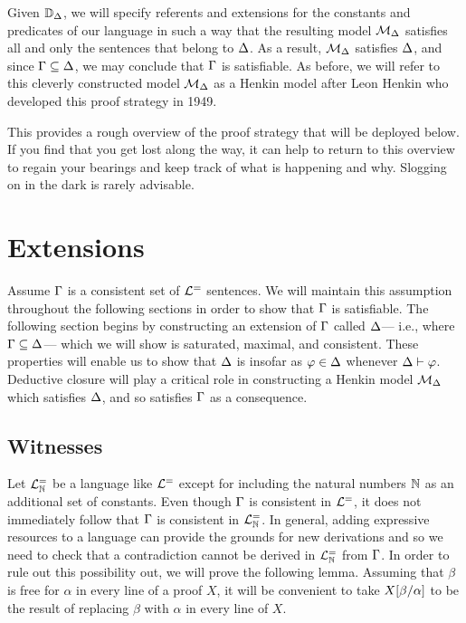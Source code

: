 Given $\mathbb{D}_{\Delta}$, we will specify referents and extensions for the constants and predicates of our language in such a way that the resulting model $\mathcal{M}_{\Delta}$ satisfies all and only the sentences that belong to $\Delta$.
As a result, $\mathcal{M}_{\Delta}$ satisfies $\Delta$, and since $\Gamma\subseteq\Delta$, we may conclude that $\Gamma$ is satisfiable. 
As before, we will refer to this cleverly constructed model $\mathcal{M}_{\Delta}$ as a Henkin model after Leon Henkin who developed this proof strategy in 1949.

This provides a rough overview of the proof strategy that will be deployed below.
If you find that you get lost along the way, it can help to return to this overview to regain your bearings and keep track of what is happening and why.
Slogging on in the dark is rarely advisable.







\section{Extensions}%
  \label{sec:Extensions}

Assume $\Gamma$ is a consistent set of $\mathcal{L}^{=}$ sentences.
We will maintain this assumption throughout the following sections in order to show that $\Gamma$ is satisfiable. 
The following section begins by constructing an extension of $\Gamma$ called $\Delta$--- i.e., where $\Gamma \subseteq \Delta$---  which we will show is saturated, maximal, and consistent.
These properties will enable us to show that $\Delta$ is  insofar as $\varphi\in\Delta$ whenever $\Delta\vdash\varphi$. 
Deductive closure will play a critical role in constructing a Henkin model $\mathcal{M}_{\Delta}$ which satisfies $\Delta$, and so satisfies $\Gamma$ as a consequence. 





\subsection{Witnesses}%
  \label{sub:Witnesses}
  

Let $\mathcal{L}^{=}_{\mathbb{N}}$ be a language like $\mathcal{L}^{=}$ except for including the natural numbers $\mathbb{N}$ as an additional set of constants.
Even though $\Gamma$ is consistent in $\mathcal{L}^{=}$, it does not immediately follow that $\Gamma$ is consistent in $\mathcal{L}^{=}_{\mathbb{N}}$.
In general, adding expressive resources to a language can provide the grounds for new derivations and so we need to check that a contradiction cannot be derived in $\mathcal{L}^{=}_{\mathbb{N}}$ from $\Gamma$.
In order to rule out this possibility out, we will prove the following lemma.
Assuming that $\beta$ is free for $\alpha$ in every line of a proof $X$, it will be convenient to take $X[\beta/\alpha]$ to be the result of replacing $\beta$ with $\alpha$ in every line of $X$.

